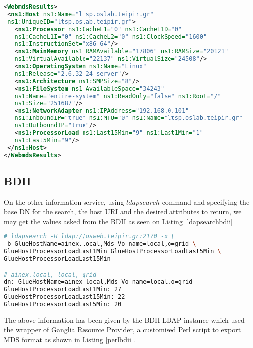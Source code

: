 \begin{lstlisting}[language=XML,caption=WebMDS results from XPath query,label=xpath_result]
<WebmdsResults>
 <ns1:Host ns1:Name="ltsp.oslab.teipir.gr" 
 ns1:UniqueID="ltsp.oslab.teipir.gr">
   <ns1:Processor ns1:CacheL1="0" ns1:CacheL1D="0" 
   ns1:CacheL1I="0" ns1:CacheL2="0" ns1:ClockSpeed="1600" 
   ns1:InstructionSet="x86_64"/>
   <ns1:MainMemory ns1:RAMAvailable="17806" ns1:RAMSize="20121" 
   ns1:VirtualAvailable="22137" ns1:VirtualSize="24508"/>
   <ns1:OperatingSystem ns1:Name="Linux" 
   ns1:Release="2.6.32-24-server"/>
   <ns1:Architecture ns1:SMPSize="8"/>
   <ns1:FileSystem ns1:AvailableSpace="34243" 
   ns1:Name="entire-system" ns1:ReadOnly="false" ns1:Root="/" 
   ns1:Size="251687"/>
   <ns1:NetworkAdapter ns1:IPAddress="192.168.0.101" 
   ns1:InboundIP="true" ns1:MTU="0" ns1:Name="ltsp.oslab.teipir.gr" 
   ns1:OutboundIP="true"/>
   <ns1:ProcessorLoad ns1:Last15Min="9" ns1:Last1Min="1" 
   ns1:Last5Min="9"/>
 </ns1:Host>
</WebmdsResults>
\end{lstlisting}

\subsection{BDII}

On the other information service, using $ldapsearch$ command and specifying the base DN for the search, the host URI and the desired attributes to return, we may get the values asked from the BDII as seen on Listing \ref{ldapsearchbdii}

\begin{lstlisting}[language=bash,caption=BDII LDAP search for Glue CE ProcessorLoad attributes,label=ldapsearchbdii]
# ldapsearch -H ldap://osweb.teipir.gr:2170 -x \
-b GlueHostName=ainex.local,Mds-Vo-name=local,o=grid \
GlueHostProcessorLoadLast1Min GlueHostProcessorLoadLast5Min \
GlueHostProcessorLoadLast15Min

# ainex.local, local, grid
dn: GlueHostName=ainex.local,Mds-Vo-name=local,o=grid
GlueHostProcessorLoadLast1Min: 27
GlueHostProcessorLoadLast15Min: 22
GlueHostProcessorLoadLast5Min: 20
\end{lstlisting}

The above information has been given by the BDII LDAP instance which used the wrapper of Ganglia Resource Provider, a customised Perl script to export MDS format as shown in Listing \ref{perlbdii}.

